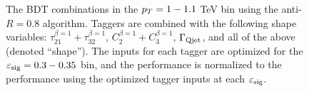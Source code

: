 \begin{figure}
\caption{The BDT combinations in the $p_T = 1-1.1$ TeV bin using the anti-\kT $R=0.8$ algorithm. Taggers are combined with the following shape variables: $\tau_{21}^{\beta=1}+\tau_{32}^{\beta=1}$, $C_{2}^{\beta=1}+C_{3}^{\beta=1}$, $\Gamma_{\rm Qjet}$, and all of the above (denoted ``shape''). The inputs for each tagger are optimized for the $\varepsilon_{\rm sig}=0.3-0.35$ bin, and the performance is normalized to the performance using the optimized tagger inputs at each $\varepsilon_{\rm sig}$.}
\label{fig:pt1000_allcompare_AKt_R08_eps0_35}
\end{figure}

